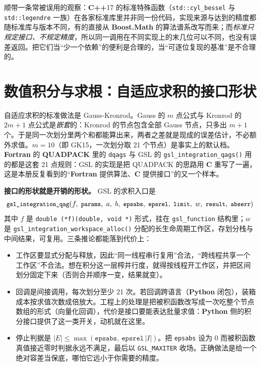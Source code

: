 \documentclass[12pt,a4paper,fontset=fandol]{ctexbook}
\newcommand{\Fn}[1]{\texttt{#1()}}
\newcommand{\Tp}[1]{\texttt{#1}}
\newcommand{\Bk}{\allowbreak}
\newcommand{\Lib}[1]{\textbf{#1}}
\newcommand{\Lang}[1]{\textsf{\bfseries #1}}
\newcommand{\CL}{\Lang{C}}
\newcommand{\CPP}{\Lang{C++}}
\newcommand{\FTN}{\Lang{Fortran}}
\newcommand{\PY}{\Lang{Python}}
\begin{document}
顺带一条常被误用的观察：\CPP{}17 的标准特殊函数（\Tp{std::{\Bk}cyl\_{\Bk}bessel} 与 \Tp{std::{\Bk}legendre} 一族）在各家标准库里并非同一份代码，实现来源与达到的精度都随标准库与版本不同，有的直接从 \Lib{Boost.Math} 的算法谱系改写而来；而\emph{标准只规定接口、不规定精度}，所以同一调用在不同实现上的末几位可以不同，也没有误差返回。把它们当``少一个依赖''的便利是合理的，当``可逐位复现的基准''是不合理的。

\section{数值积分与求根：自适应求积的接口形状}

自适应求积的标准做法是 Gauss-Kronrod。Gauss 的 $m$ 点公式与 Kronrod 的 $2m+1$ 点公式是\emph{嵌套}的：Kronrod 的节点包含全部 Gauss 节点，只多出 $m+1$ 个。于是同一次划分里两个和都能算出来，两者之差就是现成的误差估计，不必额外求值。$m=10$（即 GK15，一次划分取 21 个节点）是事实上的默认档。\FTN{} 的 \Lib{QUADPACK} 里的 \Tp{dqags} 与 GSL 的 \Fn{gsl\_integration\Bk\_qags} 用的都是这套 21 点规则：GSL 的实现是把 QUADPACK 的思路用 \CL{} 重写了一遍，这是本册反复看到的``\FTN{} 提供算法、\CL{} 提供接口''的又一个样本。

\textbf{接口的形状就是开销的形状。} GSL 的求积入口是
\[{\small
\Tp{gsl\_integration\_qag}(f,\ \texttt{params},\ a,\ b,\ \texttt{epsabs},\ \texttt{epsrel},\ \texttt{limit},\ w,\ \texttt{result},\ \texttt{abserr})
}\]
其中 $f$ 是 \Tp{double (*f)(double, void *)} 形式，挂在 \Tp{gsl\_function} 结构里；$w$ 是 \Fn{gsl\_integration\Bk\_workspace\Bk\_alloc} 分配的长生命周期工作区，存划分栈与中间结果，可复用。三条推论都能落到代价上：
\begin{itemize}
\item 工作区要显式分配与释放，因此``同一线程串行复用''合法，``跨线程共享一个工作区''不合法。想在积分这一层榨并行度，就得按线程开工作区，并把区间划分固定下来（否则合并顺序一变，结果就变）。
\item 回调是间接调用，每次划分至少 21 次。若回调跨语言（\PY{} 闭包），装箱成本按求值次数成倍放大。工程上的处理是把被积函数改写成一次吃整个节点数组的形式（向量化回调），代价是接口要能表达批量求值：\PY{} 侧的积分接口提供了这一类开关，动机就在这里。
\item 停止判据是 $|E|\le\max(\texttt{epsabs},\ \texttt{epsrel}\,|I|)$。把 \Tp{epsabs} 设为 $0$ 而被积函数真值接近零时判据永远不满足，最后以 \Tp{GSL\_MAXITER} 收场。正确做法是给一个绝对容差当保底，哪怕它远小于你需要的精度。
\end{itemize}
\end{document}
